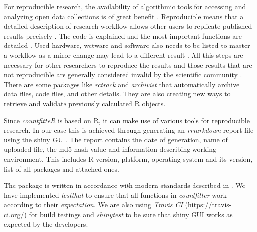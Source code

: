 For reproducible research, the availability of algorithmic tools for accessing and analyzing open data collections is of great benefit \cite{lahti_retrieval_2017}. Reproducible means that a detailed description of research workflow allows other users to replicate published results precisely \citep{leeper_archiving_2014}. The code is explained and the most important functions are detailed \citep{thioulouse_online_2010}. 
Used hardware, wetware and software also needs to be listed to master a workflow as a minor change may lead to a different result \citep{rodiger_r_2015}. 
All this steps are necessary for other researchers to reproduce the results and those results that are not reproducible are generally considered invalid by the scientific community \citep{rodiger_r_2015}.
There are some packages like \emph{rctrack} \citep{liu_r_2014} and \emph{archivist} \citep{Biecek_2017} that automatically archive data files, code files, and other details. They are also creating new ways to retrieve and validate previously calculated R objects. 

Since \emph{countfitteR} is based on R, it can make use of various tools for reproducible research. In our case this is achieved through generating an \emph{rmarkdown} \citep{rmarkdown} report file using the shiny GUI. The report contains the date of generation, name of uploaded file, the md5 hash value and information describing working environment. This includes R version, platform, operating system and its version, list of all packages and attached ones. 

The package is written in accordance with modern standards described in \cite{R_Packages}. We have implemented \emph{testthat} \citep{testthat} to ensure that all functions in \emph{countfitter} work according to their \textit{expectation}. We are also using \emph{Travis CI} (\url{https://travis-ci.org/}) for build testings and \emph{shinytest} \citep{shinytest} to be sure that shiny GUI works as expected by the developers.



